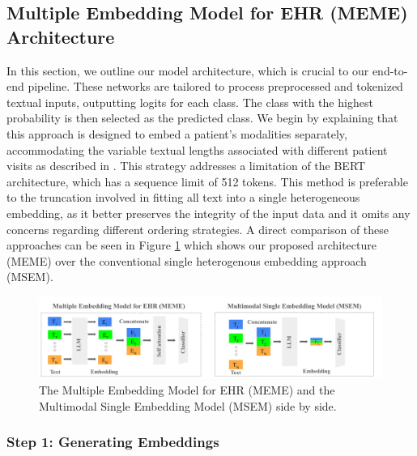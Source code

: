 \documentclass[pmlr]{jmlr}%
\begin{document}
\subsection{Multiple Embedding Model for EHR (MEME) Architecture}
In this section, we outline our model architecture, which is crucial to our end-to-end pipeline. These networks are tailored to process preprocessed and tokenized textual inputs, outputting logits for each class. The class with the highest probability is then selected as the predicted class. We begin by explaining that this approach is designed to embed a patient's modalities separately, accommodating the variable textual lengths associated with different patient visits as described in \citep{rupp_exbehrt_2023}. This strategy addresses a limitation of the BERT architecture, which has a sequence limit of 512 tokens. This method is preferable to the truncation involved in fitting all text into a single heterogeneous embedding, as it better preserves the integrity of the input data and it omits any concerns regarding different ordering strategies. A direct comparison of these approaches can be seen in Figure \ref{arc} which shows our proposed architecture (MEME) over the conventional single heterogenous embedding approach (MSEM).

\begin{figure}[t]
   \centering 
   \includegraphics[width=\textwidth]{arc.png} 
   \caption{The Multiple Embedding Model for EHR (MEME) and the Multimodal Single Embedding Model (MSEM) side by side.}
   \label{arc} 
    \vspace*{-0.5cm}
 \end{figure} 

\subsubsection{Step 1: Generating Embeddings}
\end{document}
